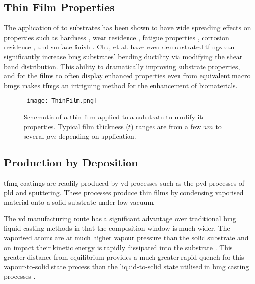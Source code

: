 \documentclass[a4paper,12pt,oneside]{report}%
\begin{document}
\subsection{Thin Film Properties}
The application of  to substrates has been shown to have wide spreading effects on properties such as hardness \cite{Chu2012},  wear residence \cite{Liu2009, Prakash2005}, fatigue properties \cite{Chiang2006, Chu2011}, corrosion residence \cite{Chu2009}, and surface finish \cite{Liu2009, Chiang2006, Chu2011, Tsai2012}. Chu, et al. \cite{Chu2012} have even demonstrated \glspl{tfmg} can significantly increase \gls{bmg} substrates' bending ductility via modifying the shear band distribution. This ability to dramatically improving substrate properties, and for the films to often display enhanced properties even from equivalent macro \glspl{bmg} makes \glspl{tfmg} an intriguing method for the enhancement of biomaterials.

\begin{figure}[htbp]
	\centering
	\texttt{[image: ThinFilm.png]}
	\caption[Schematic of a thin film applied to a substrate to modify its properties. Typical film thickness ($t$) ranges are from a few $nm$ to several $\mu m$ depending on application.]{Schematic of a thin film applied to a substrate to modify its properties. Typical film thickness ($t$) ranges are from a few $nm$ to several $\mu m$ depending on application.}
	\label{fig:ThinFilm}
\end{figure}

\subsection{Production by Deposition}
\Gls{tfmg} coatings are readily produced by \gls{vd} processes such as the \gls{pvd} processes of \gls{pld} and sputtering. These processes produce thin films by condensing vaporised material onto a solid substrate under low vacuum. 

The \gls{vd} manufacturing route has a significant advantage over traditional \gls{bmg} liquid casting methods in that the composition window is much wider. The vaporised atoms are at much higher vapour pressure than the solid substrate and on impact their kinetic energy is rapidly dissipated into the substrate \cite{Ishii2014}. This greater distance from equilibrium provides a much greater rapid quench for this vapour-to-solid state process than the liquid-to-solid state utilised in \gls{bmg} casting processes \cite{Chu2012b}. 
\end{document}
